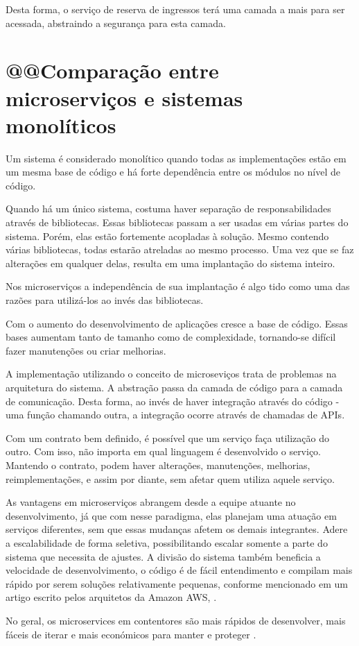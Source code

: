 Desta forma, o serviço de reserva de ingressos terá uma camada a mais
para ser acessada, abstraindo a segurança para esta camada.

\section{@@Comparação entre microserviços e sistemas monolíticos}\label{microservicos-monoliticos}

Um sistema é considerado monolítico quando todas as implementações estão em um mesma base de código
e há forte dependência entre os módulos no nível de código.

Quando há um único sistema, costuma haver separação de responsabilidades através de bibliotecas.
Essas bibliotecas passam a ser usadas em várias partes do sistema. Porém, elas estão fortemente
acopladas à solução.
Mesmo contendo várias bibliotecas, todas estarão atreladas ao mesmo processo.
Uma vez que se faz alterações em qualquer delas, resulta em uma implantação do sistema inteiro.

Nos microserviços a independência de sua implantação é algo tido como uma das razões para
utilizá-los ao invés das bibliotecas.

Com o aumento do desenvolvimento de aplicações cresce a base de código.
Essas bases aumentam tanto de tamanho como de complexidade,
tornando-se difícil fazer manutenções ou criar melhorias.

A implementação utilizando o conceito de microseviços trata de problemas na arquitetura do sistema.
A abstração passa da camada de código para a camada de comunicação. Desta forma, ao invés de haver
integração através do código - uma função chamando outra, a integração ocorre através de chamadas de
APIs.

Com um contrato bem definido, é possível que um serviço faça utilização do outro.
Com isso, não importa em qual linguagem é desenvolvido o serviço.
Mantendo o contrato, podem haver alterações, manutenções, melhorias, reimplementações,
e assim por diante, sem afetar quem utiliza aquele serviço.

As vantagens em microserviços abrangem desde a equipe atuante no desenvolvimento, já que com nesse paradigma,
elas planejam uma atuação em serviços diferentes, sem que essas mudanças afetem os demais integrantes.
Adere a escalabilidade de forma seletiva, possibilitando escalar somente a parte do sistema que necessita de ajustes.
A divisão do sistema também beneficia a velocidade de desenvolvimento, o código é de fácil entendimento e
compilam mais rápido por serem soluções relativamente pequenas, conforme mencionado em um artigo escrito pelos
arquitetos da Amazon AWS, .

\begin{citacao}
No geral, os microservices em contentores são mais rápidos de desenvolver,
mais fáceis de iterar e mais económicos para manter e
proteger \cite{deploying-java-microservices-on-amazon-ec2-container-service}.
\end{citacao}
